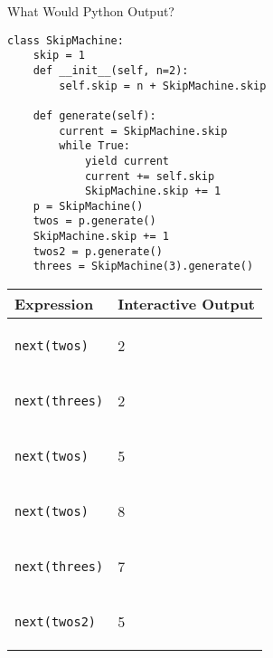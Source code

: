 \question What Would Python Output?
\begin{lstlisting}
class SkipMachine:
    skip = 1
    def __init__(self, n=2):
        self.skip = n + SkipMachine.skip

    def generate(self):
        current = SkipMachine.skip
        while True:
            yield current
            current += self.skip
            SkipMachine.skip += 1
    p = SkipMachine()
    twos = p.generate()
    SkipMachine.skip += 1
    twos2 = p.generate()
    threes = SkipMachine(3).generate()
\end{lstlisting}
\begin{tabular}{|p{5cm}|p{5cm}|}
\hline
\textbf{Expression} & \textbf{Interactive Output}\\\hline
\begin{lstlisting}
next(twos)
\end{lstlisting} & \begin{solution}
2
\end{solution}\\ \hline
\begin{lstlisting}
next(threes)
\end{lstlisting} & \begin{solution}
2
\end{solution} \\ \hline
\begin{lstlisting}
next(twos)
\end{lstlisting} & \begin{solution}
5
\end{solution} \\ \hline
\begin{lstlisting}
next(twos)
\end{lstlisting} & \begin{solution}
8
\end{solution} \\ \hline
\begin{lstlisting}
next(threes)
\end{lstlisting} & \begin{solution}
7
\end{solution} \\ \hline
\begin{lstlisting}
next(twos2)
\end{lstlisting} &  \begin{solution}
5
\end{solution}\\ \hline
\end{tabular}
